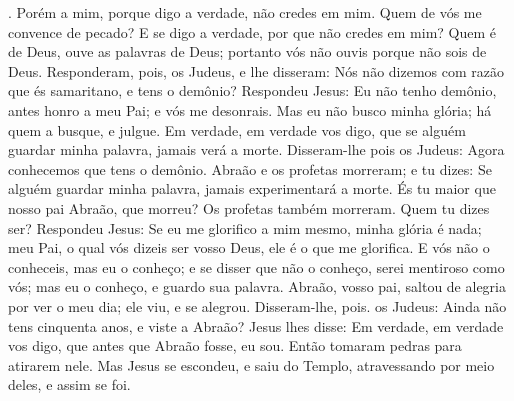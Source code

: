 {{} .
Porém a mim, porque
{} digo a verdade, não credes em mim.
Quem de vós me convence de pecado? E se digo a verdade, por que não credes em mim?
Quem é de Deus, ouve as palavras de Deus; portanto vós não
{} ouvis porque não sois de Deus.
Responderam, pois, os Judeus, e lhe disseram: Nós não dizemos com razão que és samaritano, e tens o demônio?
Respondeu Jesus: Eu não tenho demônio, antes honro a meu Pai; e vós me desonrais.
Mas eu não busco minha glória; há quem a busque, e julgue.
Em verdade, em verdade vos digo, que se alguém guardar minha palavra, jamais verá a morte.
Disseram-lhe pois os Judeus: Agora conhecemos que tens o demônio. Abraão e os profetas morreram; e tu dizes: Se alguém guardar minha palavra, jamais experimentará a morte.
És tu maior que nosso pai Abraão, que morreu? Os profetas também morreram. Quem tu dizes ser?
Respondeu Jesus: Se eu me glorifico a mim mesmo, minha glória é nada; meu Pai, o qual vós dizeis ser vosso Deus, ele é o que me glorifica.
E vós não o conheceis, mas eu o conheço; e se disser que não o conheço, serei mentiroso como vós; mas eu o conheço, e guardo sua palavra.
Abraão, vosso pai, saltou de alegria por ver o meu dia; ele viu, e se alegrou.
Disseram-lhe, pois. os Judeus: Ainda não tens cinquenta anos, e viste a Abraão?
Jesus lhes disse: Em verdade, em verdade vos digo, que antes que Abraão fosse, eu sou.
Então tomaram pedras para atirarem nele. Mas Jesus se escondeu, e saiu do Templo, atravessando por meio deles, e assim se foi.

}
